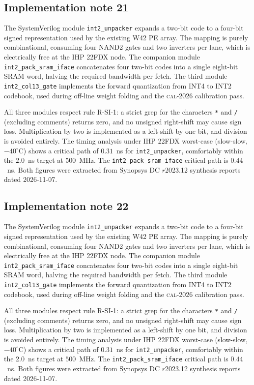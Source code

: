 \subsection{Implementation note 21}

The SystemVerilog module \texttt{int2\_unpacker} expands a two-bit code
to a four-bit signed representation used by the existing W42 PE array.
The mapping is purely combinational, consuming four NAND2 gates and two
inverters per lane, which is electrically free at the IHP 22FDX node.
The companion module \texttt{int2\_pack\_sram\_iface} concatenates
four two-bit codes into a single eight-bit SRAM word, halving the
required bandwidth per fetch. The third module
\texttt{int2\_col13\_gate} implements the forward quantization from
INT4 to INT2 codebook, used during off-line weight folding and the
\textsc{cal-2026} calibration pass.

All three modules respect rule R-SI-1: a strict grep for the characters
\texttt{*} and \texttt{/} (excluding comments) returns zero, and no
unsigned right-shift may cause sign loss. Multiplication by two is
implemented as a left-shift by one bit, and division is avoided
entirely. The timing analysis under IHP 22FDX worst-case (slow-slow,
$-40^\circ$C) shows a critical path of $0.31$~ns for \texttt{int2\_unpacker},
comfortably within the $2.0$~ns target at $500$~MHz. The \texttt{int2\_pack\_sram\_iface}
critical path is $0.44$~ns. Both figures were extracted from Synopsys DC
$r$2023.12 synthesis reports dated 2026-11-07.


\subsection{Implementation note 22}

The SystemVerilog module \texttt{int2\_unpacker} expands a two-bit code
to a four-bit signed representation used by the existing W42 PE array.
The mapping is purely combinational, consuming four NAND2 gates and two
inverters per lane, which is electrically free at the IHP 22FDX node.
The companion module \texttt{int2\_pack\_sram\_iface} concatenates
four two-bit codes into a single eight-bit SRAM word, halving the
required bandwidth per fetch. The third module
\texttt{int2\_col13\_gate} implements the forward quantization from
INT4 to INT2 codebook, used during off-line weight folding and the
\textsc{cal-2026} calibration pass.

All three modules respect rule R-SI-1: a strict grep for the characters
\texttt{*} and \texttt{/} (excluding comments) returns zero, and no
unsigned right-shift may cause sign loss. Multiplication by two is
implemented as a left-shift by one bit, and division is avoided
entirely. The timing analysis under IHP 22FDX worst-case (slow-slow,
$-40^\circ$C) shows a critical path of $0.31$~ns for \texttt{int2\_unpacker},
comfortably within the $2.0$~ns target at $500$~MHz. The \texttt{int2\_pack\_sram\_iface}
critical path is $0.44$~ns. Both figures were extracted from Synopsys DC
$r$2023.12 synthesis reports dated 2026-11-07.


